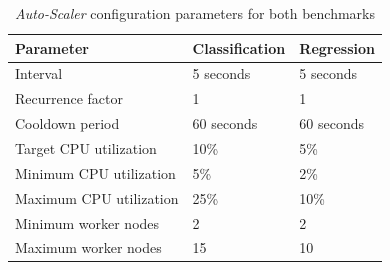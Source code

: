 \begin{table}[ht]
\centering
\begin{tabular}{@{}l|ll@{}}
\toprule
Parameter               & Classification & Regression \\ \midrule
Interval                & 5 seconds      & 5 seconds  \\
Recurrence factor       & 1              & 1          \\
Cooldown period         & 60 seconds     & 60 seconds \\
Target CPU utilization  & 10\%           & 5\%        \\
Minimum CPU utilization & 5\%            & 2\%       \\
Maximum CPU utilization & 25\%           & 10\%       \\
Minimum worker nodes    & 2              & 2         \\
Maximum worker nodes    & 15             & 10         \\ \bottomrule
\end{tabular}
\caption{\textit{Auto-Scaler} configuration parameters for both benchmarks}
\label{table:07_auto-scaler_config_parameter}
\end{table}

\newpage
